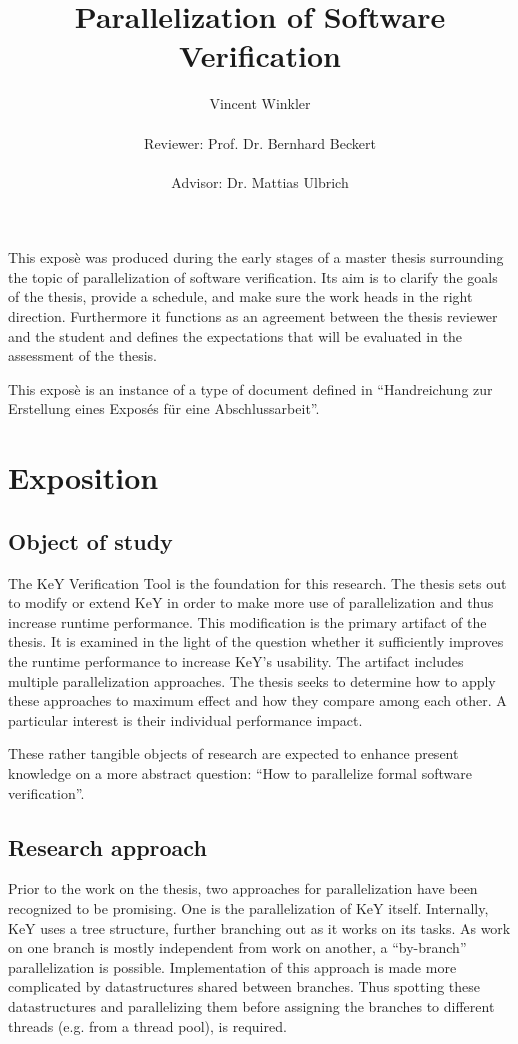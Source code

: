 \documentclass{scrartcl}
\title{Parallelization of Software Verification}
\author{
    Vincent Winkler\\
    \vspace{1em}\\
    Reviewer: Prof. Dr. Bernhard Beckert\\
    \vspace{1em}\\
    Advisor: Dr. Mattias Ulbrich
}
\begin{document}
\maketitle

This exposè was produced during the early stages of a master thesis
surrounding the topic of parallelization of software verification.
Its aim is to clarify the goals of the thesis, provide a schedule,
and make sure the work heads in the right direction.
Furthermore it functions as an agreement between the thesis reviewer and the student
and defines the expectations that will be evaluated in the assessment of the thesis.

This exposè is an instance of a type of document defined in
\enquote{Handreichung zur Erstellung eines Exposés für eine Abschlussarbeit}.

\section{Exposition}
\subsection{Object of study}
The KeY Verification Tool is the foundation for this research.
The thesis sets out to modify or extend KeY in order to make more use of parallelization
and thus increase runtime performance.
This modification is the primary artifact of the thesis.
It is examined in the light of the question whether it sufficiently improves the runtime
performance to increase KeY's usability.
The artifact includes multiple parallelization approaches.
The thesis seeks to determine how to apply these approaches to maximum effect
and how they compare among each other.
A particular interest is their individual performance impact.

These rather tangible objects of research are expected
to enhance present knowledge on a more abstract question:
\enquote{How to parallelize formal software verification}.

\subsection{Research approach}
Prior to the work on the thesis,
two approaches for parallelization have been recognized to be promising.
One is the parallelization of KeY itself.
Internally, KeY uses a tree structure, further branching out as it works on its tasks.
As work on one branch is mostly independent from work on another,
a \enquote{by-branch} parallelization is possible.
Implementation of this approach is made more complicated
by datastructures shared between branches.
Thus spotting these datastructures and parallelizing them
before assigning the branches to different threads (e.g. from a thread pool),
is required.
\end{document}

